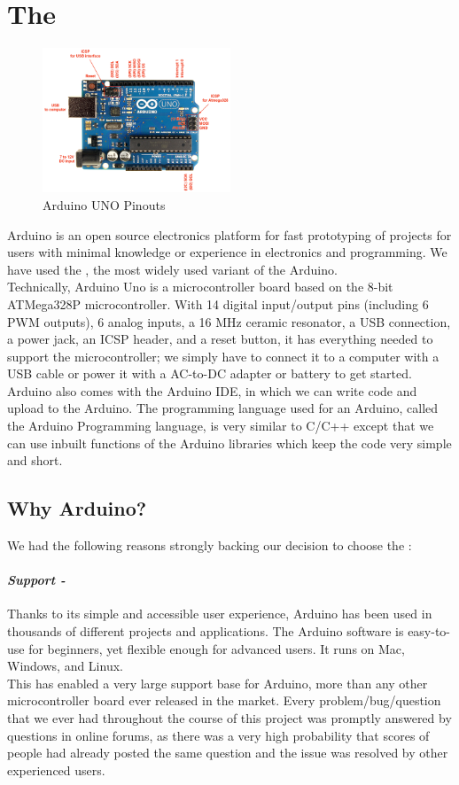 \section{The \hcsr \ultrasonic}
\begin{figure}[H]
	\centering
	\includegraphics[width=0.5\textwidth]{../Files/ArduinoUno_R3_Pinouts_600}
	\caption{Arduino UNO Pinouts}  \label{fig:Arduino}
\end{figure}
Arduino is an open source electronics platform for fast prototyping of projects for users with minimal knowledge or experience in electronics and programming. We have used the \arduinouno, the most widely used variant of the Arduino.\\
Technically, Arduino Uno is a microcontroller board based on the 8-bit ATMega328P microcontroller. With 14 digital
input/output pins (including 6 PWM outputs), 6 analog inputs, a 16 MHz ceramic resonator, a USB connection, a power jack, an ICSP header, and a reset button, it has everything needed to support the microcontroller; we simply have to connect it to a computer with a USB cable or power it with a AC-to-DC adapter or battery to get started.\\
Arduino also comes with the Arduino IDE, in which we can write code and upload to the Arduino. The programming language used for an Arduino, called the Arduino Programming language, is very similar to C/C++ except that we can use inbuilt functions of the Arduino libraries which keep the code very simple and short.

\subsection{Why Arduino?}
We had the following reasons strongly backing our decision to choose the \arduinouno :
\paragraph{\textit{Support -}}
Thanks to its simple and accessible user experience, Arduino has been used in thousands of different projects and applications. The Arduino software is easy-to-use for beginners, yet flexible enough for advanced users. It runs on Mac, Windows, and Linux.\\
This has enabled a very large support base for Arduino, more than any other microcontroller board ever released in the market. Every problem/bug/question that we ever had throughout the course of this project was promptly answered by questions in online forums, as there was a very high probability that scores of people had already posted the same question and the issue was resolved by other experienced users.
